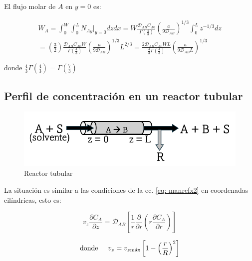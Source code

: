 El flujo molar de $A$ en $y=0$ es:

\begin{equation}
	\begin{split}
	W_A = \int_0^W \int_0^L N_{Ay}|_{y=0} dz dx
	=W \frac{\mathcal{D}_{AB} C_{A0}}{\Gamma(\frac{4}{3})} \left( \frac{a}{9 \mathcal{D}_{AB}} \right)^{1/3} \int_0^L z^{-1/3} dz \\
	=\left( \frac{3}{2} \right) \frac{\mathcal{D}_{AB} C_{A0} W}{\Gamma (\frac{4}{3})} \left( \frac{a}{9 \mathcal{D}_{AB}} \right)^{1/3} L^{2/3}
	=\frac{2 \mathcal{D}_{AB} C_{A0} WL}{\frac{4}{3} \Gamma (\frac{4}{3})} \left( \frac{a}{9 \mathcal{D}_{AB} L} \right)^{1/3}
	\end{split}
\end{equation}

donde $\frac{4}{3} \Gamma (\frac{4}{3}) = \Gamma (\frac{7}{3})$

\subsection{Perfil de concentración en un reactor tubular}

\begin{figure}[H]
	\centering
	\includegraphics[scale=0.4]{./Capitulo2/Imagenes/fig-2-8.PNG}
	\caption{Reactor tubular}
\end{figure}

La situación es similar a las condiciones de la ec. \eqref{eq: manrefx2} en coordenadas cilíndricas, esto es: 

\begin{equation} \label{eq: manrefx17}
v_z \frac{\partial C_A}{\partial z} = \mathcal{D}_{AB} \left[ \frac{1}{r} \frac{\partial}{\partial r} \left( r \frac{\partial C_A}{\partial r} \right)  \right]
\end{equation}

\begin{equation} \label{eq: manrefx18}
\text{donde} \hspace{0.5cm} v_z = v_{z\text{máx}} \left[ 1 - \left( \frac{r}{R} \right)^2 \right]
\end{equation}

